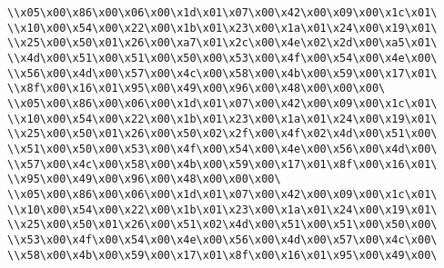 \verb|\\x05\x00\x86\x00\x06\x00\x1d\x01\x07\x00\x42\x00\x09\x00\x1c\x01\|\newline
\verb|\\x10\x00\x54\x00\x22\x00\x1b\x01\x23\x00\x1a\x01\x24\x00\x19\x01\|\newline
\verb|\\x25\x00\x50\x01\x26\x00\xa7\x01\x2c\x00\x4e\x02\x2d\x00\xa5\x01\|\newline
\verb|\\x4d\x00\x51\x00\x51\x00\x50\x00\x53\x00\x4f\x00\x54\x00\x4e\x00\|\newline
\verb|\\x56\x00\x4d\x00\x57\x00\x4c\x00\x58\x00\x4b\x00\x59\x00\x17\x01\|\newline
\verb|\\x8f\x00\x16\x01\x95\x00\x49\x00\x96\x00\x48\x00\x00\x00\|\newline
\verb|\\x05\x00\x86\x00\x06\x00\x1d\x01\x07\x00\x42\x00\x09\x00\x1c\x01\|\newline
\verb|\\x10\x00\x54\x00\x22\x00\x1b\x01\x23\x00\x1a\x01\x24\x00\x19\x01\|\newline
\verb|\\x25\x00\x50\x01\x26\x00\x50\x02\x2f\x00\x4f\x02\x4d\x00\x51\x00\|\newline
\verb|\\x51\x00\x50\x00\x53\x00\x4f\x00\x54\x00\x4e\x00\x56\x00\x4d\x00\|\newline
\verb|\\x57\x00\x4c\x00\x58\x00\x4b\x00\x59\x00\x17\x01\x8f\x00\x16\x01\|\newline
\verb|\\x95\x00\x49\x00\x96\x00\x48\x00\x00\x00\|\newline
\verb|\\x05\x00\x86\x00\x06\x00\x1d\x01\x07\x00\x42\x00\x09\x00\x1c\x01\|\newline
\verb|\\x10\x00\x54\x00\x22\x00\x1b\x01\x23\x00\x1a\x01\x24\x00\x19\x01\|\newline
\verb|\\x25\x00\x50\x01\x26\x00\x51\x02\x4d\x00\x51\x00\x51\x00\x50\x00\|\newline
\verb|\\x53\x00\x4f\x00\x54\x00\x4e\x00\x56\x00\x4d\x00\x57\x00\x4c\x00\|\newline
\verb|\\x58\x00\x4b\x00\x59\x00\x17\x01\x8f\x00\x16\x01\x95\x00\x49\x00\|\newline
